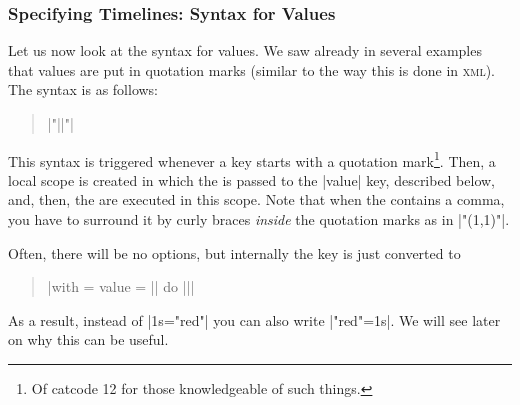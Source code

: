 \subsubsection{Specifying Timelines: Syntax for Values}

Let us now look at the syntax for values. We saw already in several
examples that values are put in quotation marks (similar to
the way this is done in \textsc{xml}). The syntax is as follows:

\begin{quote}
  \normalfont
  |"||"| 
\end{quote}

This syntax is triggered whenever a key starts with a quotation
mark\footnote{Of catcode 12 for those knowledgeable of such
  things.}. Then, a local scope is created in which the 
is passed to the |value| key, described below, and, then, the
 are executed in this scope. Note that when the
 contains a comma, you have to surround it by curly braces
\emph{inside} the quotation marks as in |"{(1,1)}"|.

Often, there will be no
options, but internally the key is just converted to
\begin{quote}
  \normalfont
  |with = {value = ||} do {||}|
\end{quote}

As a result, instead of |1s="red"| you can also write |"red"=1s|. We
will see later on why this can be useful.

